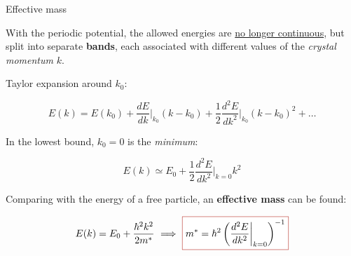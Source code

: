 \begin{frame}{Effective mass}
    \small

    With the periodic potential, the allowed energies are \underline{no longer continuous}, but split into separate \textbf{bands}, each associated with different values of the \textit{crystal momentum} $k$.

    \vfill

    \pause

    \footnotesize

    Taylor expansion around $k_0$:

    \begin{equation*}
        E(k)=E\left(k_0\right)+\frac{dE}{dk}\bigg|_{k_0}\left(k-k_0\right)+\frac{1}{2}\frac{d^2E}{dk^2}\bigg|_{k_0}\left(k-k_0\right)^2+\dots
    \end{equation*}

    \pause

    In the lowest bound, $k_0=0$ is the \textit{minimum}:

    \begin{equation*}
        E(k)\simeq E_0+\frac{1}{2}\frac{d^2E}{dk^2}\bigg|_{k=0}k^2
    \end{equation*}

    \pause

    Comparing with the energy of a free particle, an \textcolor{BrickRed}{\textbf{effective mass}} can be found:

    \begin{equation*}
        E(k)=E_0+\frac{\hbar^2k^2}{2m^*} \ \Longrightarrow \ \fcolorbox{BrickRed}{white}{\text{$\displaystyle m^*=\hbar^2\left(\frac{d^2E}{dk^2}\bigg|_{k=0}\right)^{-1}$}}
    \end{equation*}

    \normalsize
\end{frame}

